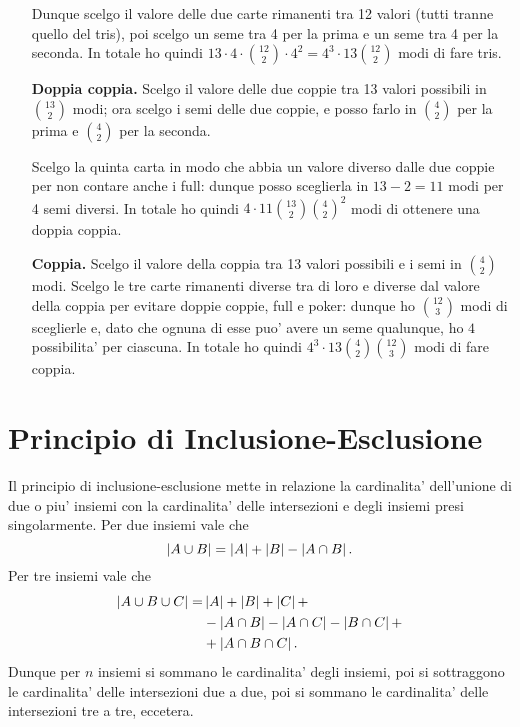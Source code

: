 \begin{itemize}
    Dunque scelgo il valore delle due carte rimanenti tra 12 valori (tutti tranne quello del tris), poi scelgo un seme tra 4 per la prima e un seme tra 4 per la seconda. In totale ho quindi $13 \cdot 4 \cdot \binom{12}{2} \cdot 4^2 = 4^3 \cdot 13 \binom{12}{2}$ modi di fare tris.
    \item[\textbf{Doppia coppia.}] Scelgo il valore delle due coppie tra 13 valori possibili in $\binom{13}{2}$ modi; ora scelgo i semi delle due coppie, e posso farlo in $\binom{4}{2}$ per la prima e $\binom{4}{2}$ per la seconda. 
    
    Scelgo la quinta carta in modo che abbia un valore diverso dalle due coppie per non contare anche i full: dunque posso sceglierla in $13 - 2 = 11$ modi per 4 semi diversi. In totale ho quindi $4 \cdot 11\binom{13}{2}\binom{4}{2}^2$ modi di ottenere una doppia coppia.
    \item[\textbf{Coppia.}] Scelgo il valore della coppia tra 13 valori possibili e i semi in $\binom{4}{2}$ modi. Scelgo le tre carte rimanenti diverse tra di loro e diverse dal valore della coppia per evitare doppie coppie, full e poker: dunque ho $\binom{12}{3}$ modi di sceglierle e, dato che ognuna di esse puo' avere un seme qualunque, ho $4$ possibilita' per ciascuna. In totale ho quindi $4^3 \cdot 13 \binom{4}{2} \binom{12}{3}$ modi di fare coppia.
\end{itemize}

\section{Principio di Inclusione-Esclusione}

Il principio di inclusione-esclusione mette in relazione la cardinalita' dell'unione di due o piu' insiemi con la cardinalita' delle intersezioni e degli insiemi presi singolarmente. Per due insiemi vale che \begin{equation}
    \left|A \cup B\right| = \left|A\right| + \left|B\right| - \left|A \cap B\right|.
\end{equation}
Per tre insiemi vale che \begin{alignat*}{1}
    \left|A \cup B \cup C\right| = 
        &\left|A\right| + \left|B\right| + \left|C\right| +\\
        &- \left|A \cap B\right| - \left|A \cap C\right| - \left|B \cap C\right| +\\
        &+ \left|A \cap B \cap C\right|.
\end{alignat*}
Dunque per $n$ insiemi si sommano le cardinalita' degli insiemi, poi si sottraggono le cardinalita' delle intersezioni due a due, poi si sommano le cardinalita' delle intersezioni tre a tre, eccetera.

